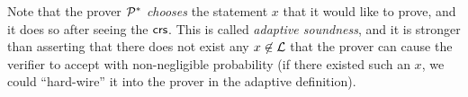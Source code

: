Note that the prover $\mathcal{P}^*$ \emph{chooses} the statement $x$ that
it would like to prove, and it does so after seeing the $\mathsf{crs}$.
This is called \emph{adaptive soundness}, and it is stronger than asserting that there does not exist any $x \not \in \mathcal{L}$
that the prover can cause the verifier to accept with non-negligible probability
(if there existed such an $x$, we could ``hard-wire''
it into the prover in the adaptive definition).

